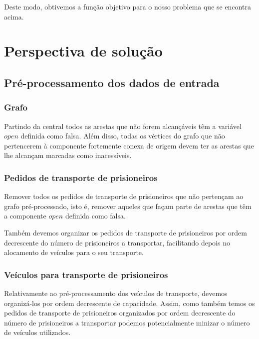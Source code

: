 \documentclass[article, a4paper, 12pt, oneside]{memoir}
\begin{document}
Deste modo, obtivemos a função objetivo para o nosso problema que se encontra acima.

\newpage
\chapter[Perspectiva de solução][Perspectiva de solução]{Perspectiva de solução} \label{\thechapter}

\section{Pré-processamento dos dados de entrada}

\subsection{Grafo}
Partindo da central todos as arestas que não forem alcançáveis têm a variável $open$ definida como falsa. 
Além disso, todas os vértices do grafo que não pertencerem à componente fortemente conexa de origem devem ter as arestas que lhe alcançam marcadas como inacessíveis.

\subsection{Pedidos de transporte de prisioneiros}
Remover todos os pedidos de transporte de prisioneiros que não pertençam ao grafo pré-processado, isto é, remover aqueles que façam parte de arestas que têm a componente $open$ definida como falsa.

Também devemos organizar os pedidos de transporte de prisioneiros por ordem decrescente do número de prisioneiros a transportar, facilitando depois no alocamento de veículos para o seu transporte.

\subsection{Veículos para transporte de prisioneiros}
Relativamente ao pré-processamento dos veículos de transporte, devemos organizá-los por ordem decrescente de capacidade. Assim, como também temos os pedidos de transporte de prisioneiros organizados por ordem decrescente do número de prisioneiros a transportar podemos potencialmente minizar o número de veículos utilizados.
\end{document}
